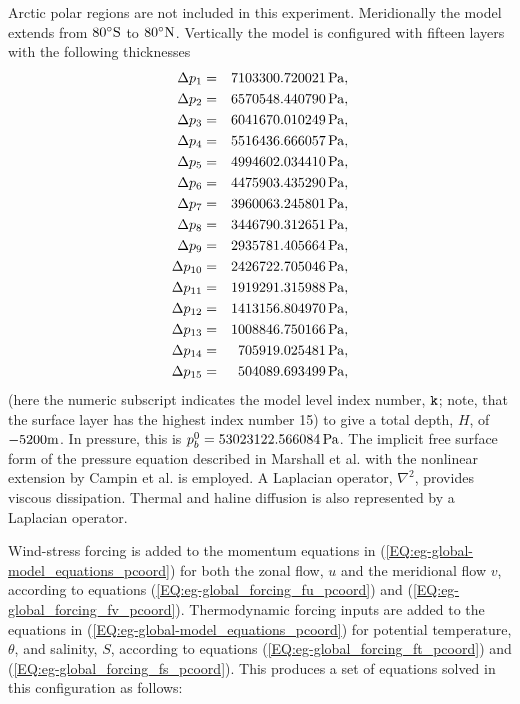 Arctic polar regions are not included in this experiment. Meridionally
the model extends from $80^{\circ}{\rm S}$ to $80^{\circ}{\rm N}$.
Vertically the model is configured with fifteen layers with the
following thicknesses %
\begin{eqnarray*}
  \Delta p_{1} &=& 7103300.720021\mbox{\,Pa},\\
  \Delta p_{2} &=& 6570548.440790\mbox{\,Pa},\\
  \Delta p_{3} &=& 6041670.010249\mbox{\,Pa},\\
  \Delta p_{4} &=& 5516436.666057\mbox{\,Pa},\\
  \Delta p_{5} &=& 4994602.034410\mbox{\,Pa},\\
  \Delta p_{6} &=& 4475903.435290\mbox{\,Pa},\\
  \Delta p_{7} &=& 3960063.245801\mbox{\,Pa},\\
  \Delta p_{8} &=& 3446790.312651\mbox{\,Pa},\\
  \Delta p_{9} &=& 2935781.405664\mbox{\,Pa},\\
  \Delta p_{10}&=& 2426722.705046\mbox{\,Pa},\\
  \Delta p_{11}&=& 1919291.315988\mbox{\,Pa},\\
  \Delta p_{12}&=& 1413156.804970\mbox{\,Pa},\\
  \Delta p_{13}&=& 1008846.750166\mbox{\,Pa},\\
  \Delta p_{14}&=&  705919.025481\mbox{\,Pa},\\
  \Delta p_{15}&=&  504089.693499\mbox{\,Pa},
\end{eqnarray*}
(here the numeric subscript indicates the model level index number,
${\tt k}$; note, that the surface layer has the highest index number 15) to
give a total depth, $H$, of $-5200{\rm m}$. In pressure, this is
$p_{b}^{0}=53023122.566084\mbox{\,Pa}$. 
The implicit free surface form of the pressure equation described in
Marshall et al. \cite{marshall:97a} with the nonlinear extension by
Campin et al. \cite{campin:02} is employed. A Laplacian operator, $\nabla^2$, provides viscous
dissipation. Thermal and haline diffusion is also represented by a Laplacian operator.

Wind-stress forcing is added to the momentum equations in (\ref{EQ:eg-global-model_equations_pcoord}) 
for both the zonal flow, $u$ and the meridional flow $v$, according to equations 
(\ref{EQ:eg-global_forcing_fu_pcoord}) and (\ref{EQ:eg-global_forcing_fv_pcoord}).
Thermodynamic forcing inputs are added to the equations 
in (\ref{EQ:eg-global-model_equations_pcoord}) for
potential temperature, $\theta$, and salinity, $S$, according to equations 
(\ref{EQ:eg-global_forcing_ft_pcoord}) and (\ref{EQ:eg-global_forcing_fs_pcoord}).
This produces a set of equations solved in this configuration as follows:

